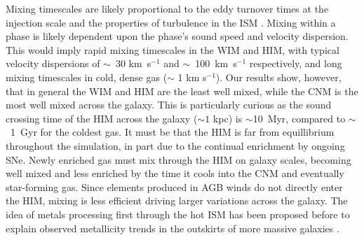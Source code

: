 %
%
%

%
%

Mixing timescales are likely proportional to the eddy turnover times at the injection scale \citep{PanScannapieco2010, Colbrook2017} and the properties of turbulence in the ISM \citep{YangKrumholz2012,Sarmento2017,Sarmento2018}. Mixing within a phase is likely dependent upon the phase's sound speed and velocity dispersion. This would imply rapid mixing timescales in the WIM and HIM, with typical velocity dispersions of $\sim$~30 km~s$^{-1}$ and $\sim$~100~km~s$^{-1}$ respectively, and long mixing timescales in cold, dense gas ($\sim$ 1 km s$^{-1}$). Our results show, however, that in general the WIM and HIM are the least well mixed, while the CNM is the most well mixed across the galaxy. This is particularly curious as the sound crossing time of the HIM across the galaxy ($\sim 1$ kpc) is $\sim$10~Myr, compared to $\sim$~1~Gyr for the coldest gas. It must be that the HIM is far from equillibrium throughout the simulation, in part due to the continual enrichment by ongoing SNe. Newly enriched gas must mix through the HIM on galaxy scales, becoming well mixed and less enriched by the time it cools into the CNM and eventually star-forming gas. Since elements produced in AGB winds do not directly enter the HIM, mixing is less efficient driving larger variations across the galaxy. The idea of metals processing first through the hot ISM has been proposed before to explain observed metallicity trends in the outskirts of more massive galaxies \citep{Tassis2008,Werk2011}.

